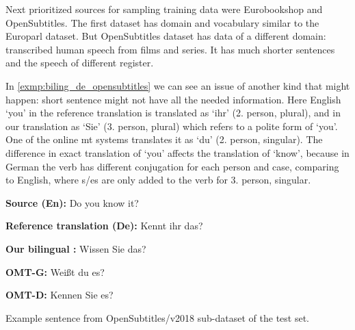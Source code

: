 Next prioritized sources for sampling training data were
Eurobookshop and OpenSubtitles.
The first dataset has domain and vocabulary similar to the Europarl dataset.
But OpenSubtitles dataset has data of a different domain:
transcribed human speech from films and series.
It has much shorter sentences and the speech of different register.

In \cref{exmp:biling_de_opensubtitles} we can see an issue of another kind
that might happen: short sentence might not have all
the needed information. Here English `you' in the reference translation
is translated as `ihr' (2. person, plural), and in our translation
as `Sie' (3. person, plural) which refers to a polite form of `you'.
One of the online \acrshort{mt} systems translates it as
`du' (2. person, singular).
The difference in exact translation of `you' affects the translation of
`know', because in German the verb has different conjugation for each
person and case, comparing to English, where s/es are only added
to the verb for 3. person, singular.

\vspace{\baselineskip}
\begin{minipage}[t]{0.9\textwidth}

\textbf{Source (En):}  Do you know it? 

\textbf{Reference translation (De):} Kennt ihr das?

\textbf{Our bilingual :} Wissen Sie das?

\textbf{OMT-G:} Weißt du es?

\textbf{OMT-D:} Kennen Sie es?

	\begin{exmp}
	Example sentence from OpenSubtitles/v2018 sub-dataset of 
	the  test set.

	\label{exmp:biling_de_opensubtitles}
	\end{exmp}
\end{minipage}
\vspace{\baselineskip}


\section{}
\label{section:multilingual_baseline}


